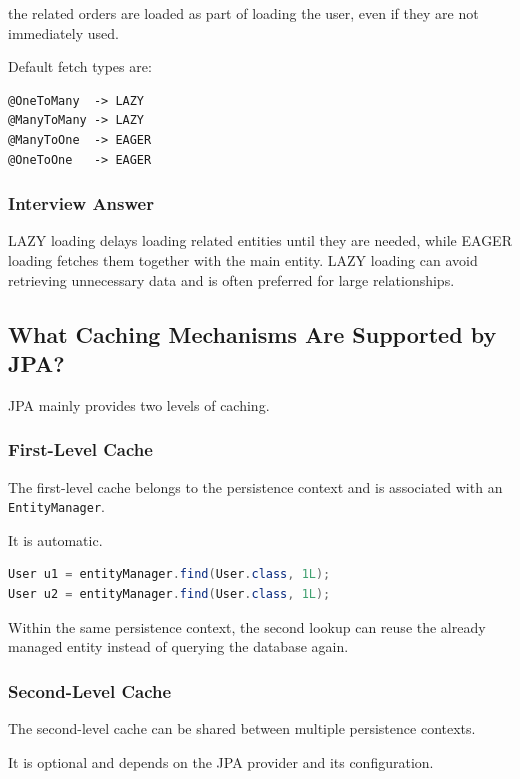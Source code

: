 \documentclass[12pt,a4paper]{article}
\begin{document}
the related orders are loaded as part of loading the user, even if they are
not immediately used.

Default fetch types are:

\begin{verbatim}
@OneToMany  -> LAZY
@ManyToMany -> LAZY
@ManyToOne  -> EAGER
@OneToOne   -> EAGER
\end{verbatim}

\subsubsection*{Interview Answer}

LAZY loading delays loading related entities until they are needed, while
EAGER loading fetches them together with the main entity. LAZY loading can
avoid retrieving unnecessary data and is often preferred for large
relationships.

\subsection{What Caching Mechanisms Are Supported by JPA?}

JPA mainly provides two levels of caching.

\subsubsection*{First-Level Cache}

The first-level cache belongs to the persistence context and is associated
with an \texttt{EntityManager}.

It is automatic.

\begin{lstlisting}[language=Java]
User u1 = entityManager.find(User.class, 1L);
User u2 = entityManager.find(User.class, 1L);
\end{lstlisting}

Within the same persistence context, the second lookup can reuse the
already managed entity instead of querying the database again.

\subsubsection*{Second-Level Cache}

The second-level cache can be shared between multiple persistence contexts.

It is optional and depends on the JPA provider and its configuration.
\end{document}
